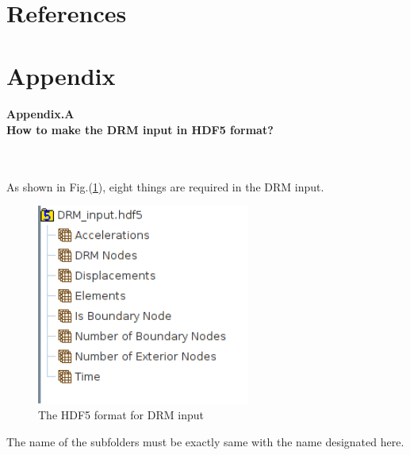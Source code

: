 \documentclass[fleqn,11pt]{article}
\begin{document}
\newpage
\section{References}
\nocite{*}




\newpage
\section{Appendix}

\paragraph{Appendix.A \\
How to make the DRM input in HDF5 format?} ~


As shown in Fig.(\ref{fig The HDF5 format for DRM input}), eight things are required in the DRM input. 

\begin{figure}[H]
  \centering
  \includegraphics[width=7cm]{../Figure-files/DRM_input_format.png}
  \caption{The HDF5 format for DRM input}
  \label{fig The HDF5 format for DRM input}
\end{figure}

The name of the subfolders must be exactly same with the name designated here.
\end{document}
